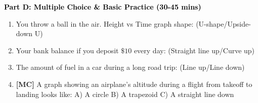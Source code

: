 \documentclass[12pt, letterpaper, fleqn]{article}
\newcommand{\blank}{\underline{\hspace{2.2cm}}}
\begin{document}
\newpage

\begin{tcolorbox}[colback=customteal!20]
\large\textcolor{black}{\textbf{Part D: Multiple Choice \& Basic Practice (30-45 mins)}}
\end{tcolorbox}

\vspace{3mm}

\begin{enumerate}[itemsep=2.5cm, leftmargin=0.6cm, resume]
\item You throw a ball in the air. Height vs Time graph shape: \blank (U-shape/Upside-down U)
\item Your bank balance if you deposit $\$10$ every day: \blank (Straight line up/Curve up)
\item The amount of fuel in a car during a long road trip: \blank (Line up/Line down)
\item \textbf{[MC]} A graph showing an airplane's altitude during a flight from takeoff to landing looks like: A) A circle B) A trapezoid C) A straight line down
\end{enumerate}
\end{document}
